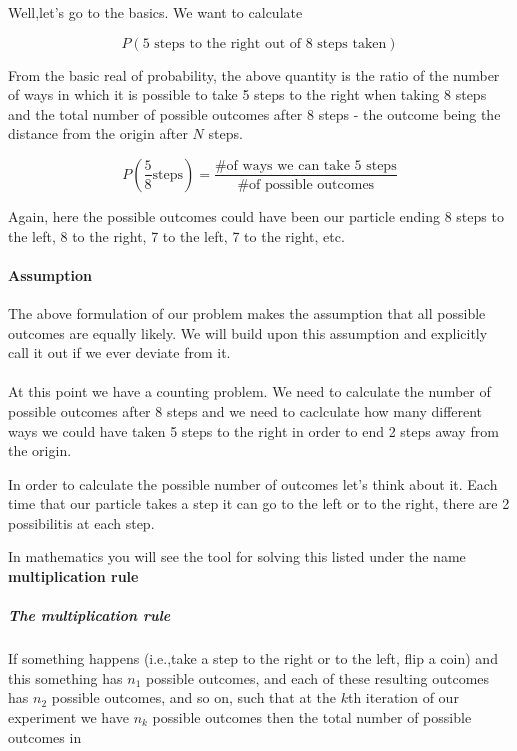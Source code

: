 Well,let's go to the basics.
We want to calculate

$$
P \left( \mbox{5 steps to the right out of 8 steps taken} \right)
$$

From the basic real of probability, the above quantity is the ratio of the number of ways in which it is possible to take 5 steps to the right when taking 8 steps and the total number of possible outcomes after 8 steps - the outcome being the distance from the origin after $N$ steps.

\begin{equation}
P \left( \frac{5}{8} \mbox{steps} \right) 
= \frac{\mbox{\# of ways we can take 5 steps}}{\mbox{\# of possible outcomes}} \label{eq:coin-probability}
\end{equation}

Again, here the possible outcomes could have been our particle ending 8 steps to the left, 8 to the right, 7 to the left, 7 to the right, etc.

\paragraph{Assumption} The above formulation of our problem makes the assumption that all possible outcomes are equally likely. We will build upon this assumption and explicitly call it out if we ever deviate from it.
\\~\\

At this point we have a counting problem.
We need to calculate the number of possible outcomes after 8 steps and we need to caclculate how many different ways we could have taken 5 steps to the right in order to end 2 steps away from the origin.

In order to calculate the possible number of outcomes let's think about it.
Each time that our particle takes a step it can go to the left or to the right, there are 2 possibilitis at each step.

In mathematics you will see the tool for solving this listed under the name \textbf{multiplication rule}

\subparagraph{The multiplication rule}
If something happens (i.e.,take a step to the right or to the left, flip a coin) and this something has $n_1$ possible outcomes, and each of these resulting outcomes has $n_2$ possible outcomes, and so on, such that at the $k$th iteration of our experiment we have $n_k$ possible outcomes then the total number of possible outcomes in

